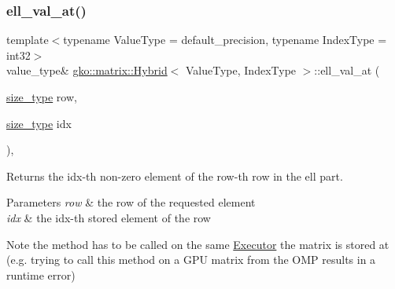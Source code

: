 \subsubsection{\texorpdfstring{ell\+\_\+val\+\_\+at()}{ell\_val\_at()}\hspace{0.1cm}{\footnotesize\ttfamily [1/2]}}
{\footnotesize\ttfamily template$<$typename Value\+Type = default\+\_\+precision, typename Index\+Type = int32$>$ \\
value\+\_\+type\& \hyperlink{classgko_1_1matrix_1_1Hybrid}{gko\+::matrix\+::\+Hybrid}$<$ Value\+Type, Index\+Type $>$\+::ell\+\_\+val\+\_\+at (\begin{DoxyParamCaption}\item[{\hyperlink{namespacegko_a6e5c95df0ae4e47aab2f604a22d98ee7}{size\+\_\+type}}]{row,  }\item[{\hyperlink{namespacegko_a6e5c95df0ae4e47aab2f604a22d98ee7}{size\+\_\+type}}]{idx }\end{DoxyParamCaption})\hspace{0.3cm}{\ttfamily [inline]}, {\ttfamily [noexcept]}}



Returns the {\ttfamily idx}-\/th non-\/zero element of the {\ttfamily row}-\/th row in the ell part. 


\begin{DoxyParams}{Parameters}
{\em row} & the row of the requested element \\
\hline
{\em idx} & the idx-\/th stored element of the row\\
\hline
\end{DoxyParams}
\begin{DoxyNote}{Note}
the method has to be called on the same \hyperlink{classgko_1_1Executor}{Executor} the matrix is stored at (e.\+g. trying to call this method on a G\+PU matrix from the O\+MP results in a runtime error) 
\end{DoxyNote}
\mbox{\label{classgko_1_1matrix_1_1Hybrid_a3e0ab990e82db430d0e05fe165a11620}} 
